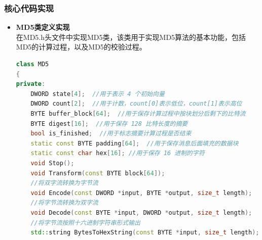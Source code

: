 \documentclass[UTF8,a4paper,10pt]{ctexart}
\begin{document}
\subsubsection{核心代码实现}
\begin{itemize}
    \item \textbf{MD5类定义实现}\\
    在MD5.h头文件中实现MD5类，该类用于实现MD5算法的基本功能，包括MD5的计算过程，以及MD5的校验过程。
    \begin{lstlisting}[language = C++]
class MD5 
{
private:
    DWORD state[4];  //用于表示 4 个初始向量 
    DWORD count[2];  //用于计数，count[0]表示低位，count[1]表示高位
    BYTE buffer_block[64];  //用于保存计算过程中按块划分后剩下的比特流
    BYTE digest[16];  //用于保存 128 比特长度的摘要 
    bool is_finished;  //用于标志摘要计算过程是否结束 
    static const BYTE padding[64];  //用于保存消息后面填充的数据块 
    static const char hex[16]; //用于保存 16 进制的字符 
    void Stop(); 
    void Transform(const BYTE block[64]);
    //将双字流转换为字节流 
    void Encode(const DWORD *input, BYTE *output, size_t length); 
    //将字节流转换为双字流 
    void Decode(const BYTE *input, DWORD *output, size_t length); 
    //将字节流按照十六进制字符串形式输出 
    std::string BytesToHexString(const BYTE *input, size_t length); 


\end{lstlisting}
\end{itemize}
\end{document}
